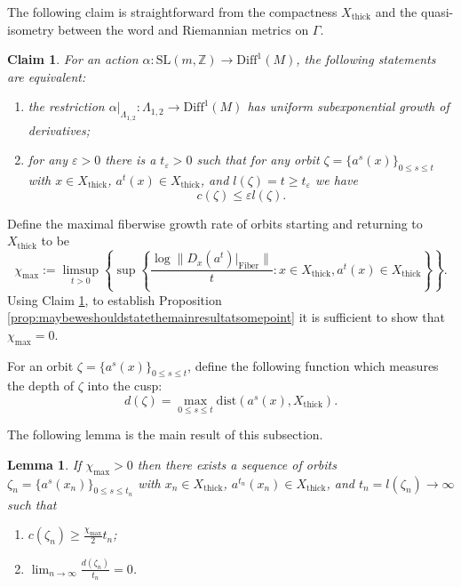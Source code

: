 \documentclass[10pt,reqno]{amsart}
\theoremstyle{Theorem}
\newtheorem{claim}[theorem]{Claim}
\newtheorem{lemma}[theorem]{Lemma}
\theoremstyle{definition}
\theoremstyle{remark}
\newcommand{\note}[1]{\marginpar{{\color{red}\footnotesize \begin{spacing}{1}#1\end{spacing}}}}
\newcommand{\restrict}[2]{{#1}{|_{{ #2}}}}
\newcommand{\diff}{\mathrm{Diff}}
\renewcommand{\epsilon}{\varepsilon}
\newcommand{\Z}{\mathbb {Z}}
\newcommand{\e}{\epsilon}
\newcommand{\Xt}{X_{\mathrm{thick}}}
\newcommand{\Sl}{\mathrm{SL}}
\def\red{\color{red}}
\begin{document}

The following claim is straightforward from the compactness  $X_{\text{thick}}$ and the quasi-isometry between the word and Riemannian metrics on $\Gamma$.  %

\begin{claim}\label{slowgrowththick} For an action $\alpha\colon \Sl(m,\Z) \to \diff^1(M)$, the following statements are equivalent:
\begin{enumerate}
\item  the restriction $\restrict \alpha {\Lambda_{1,2}}\colon \Lambda_{1,2} \to \diff^1(M)$ has uniform subexponential growth of  derivatives;
\item for any $\e>0$ there is a $t_{\e}>0$ such that for any orbit  $\zeta =  \{a^s (x)\}_{0\leq s \leq t}$ with  $x\in \Xt$, $a^t(x) \in \Xt$, and $l(\zeta) = t \geq {t_\e}$ we have  $$ c(\zeta) \leq \e l(\zeta).$$
\end{enumerate}
\end{claim}

Define the maximal fiberwise growth rate of orbits starting and  returning to $\Xt$ to be \begin{equation}\label{eq:fanorlamps}\chi_{\mathrm{max}} := \limsup_{t > 0} \left\{\sup \left\{   \frac{\log \|\restrict{D_x(a^t)}{{\text{Fiber}}}\|}{t} : x\in \Xt, a^t(x) \in \Xt\right\}\right\}.\end{equation} %
Using Claim \ref{slowgrowththick}, to establish Proposition \ref{prop:maybeweshouldstatethemainresultatsomepoint} it is sufficient to show  that $\chi_{\mathrm{max}} = 0$.

For an orbit  $\zeta = \{a^s (x)\}_{0\leq s \leq t}$,   define the following function which measures the depth of $\zeta$ into the cusp:
$$d(\zeta) = \max_{0 \leq s \leq t} \text{dist}(a^s(x), \Xt).$$


The following lemma is the main result of this subsection.

\begin{lemma}\label{lemma:maximal} If  $\chi_{\text{max}} >0$ then  there exists a sequence of orbits $\zeta_n=\{a^s (x_n)\}_{0\leq s \leq t_n}$ with  $x_n\in \Xt$, $a^{t_n}(x_n) \in \Xt$, and   $t_n = l(\zeta_n) \to \infty$ %
such that
\begin{enumerate}
\item  $\displaystyle c(\zeta_n) \geq \frac{\chi_{\mathrm{max}}}{2} t_n$;
\item  $\displaystyle \lim_{n \to \infty} \frac{d(\zeta_n)}{t_n} = 0$.
\end{enumerate}
\end{lemma}
\end{document}
